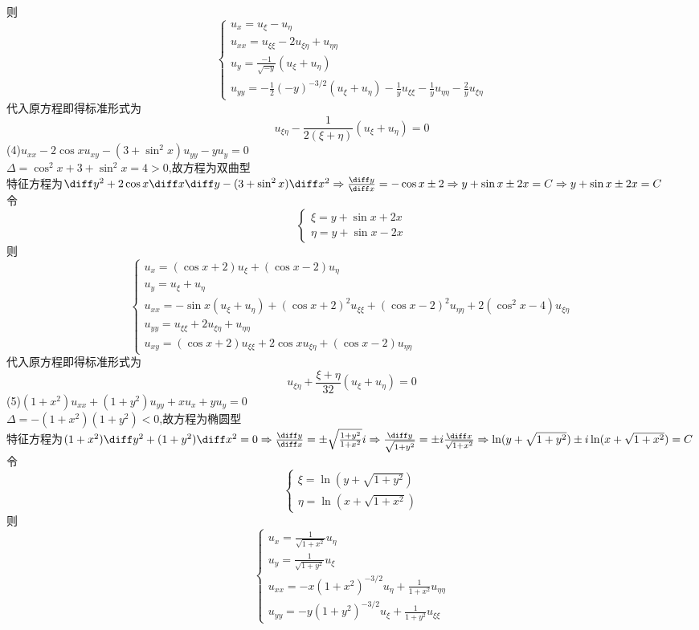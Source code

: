 则
\[\begin{cases}
u_x=u_{\xi}-u_{\eta}\\
u_{xx}=u_{\xi\xi}-2u_{\xi\eta}+u_{\eta\eta}\\
u_{y}=\frac{-1}{\sqrt{-y}}(u_{\xi}+u_{\eta})\\
u_{yy}=-\frac{1}{2}(-y)^{-3/2}(u_{\xi}+u_{\eta})-\frac{1}{y}u_{\xi\xi}-\frac{1}{y}u_{\eta\eta}-\frac{2}{y}u_{\xi\eta}
\end{cases}\]
代入原方程即得标准形式为
\[u_{\xi\eta}-\frac{1}{2(\xi+\eta)}(u_{\xi}+u_{\eta})=0\]
(4)$u_{xx}-2\cos xu_{xy}-(3+\sin^2x)u_{yy}-yu_y=0$\\
$\Delta=\cos^2x+3+\sin^2x=4>0$,故方程为双曲型\\
特征方程为$\diff y^2+2\cos x\diff x\diff y-(3+\sin^2x)\diff x^2\Rightarrow\frac{\diff y}{\diff x}=-\cos x\pm2\Rightarrow y+\sin x\pm2x=C\Rightarrow y+\sin x\pm 2x=C$\\
令\[\begin{cases}
\xi=y+\sin x+2x\\\eta=y+\sin x-2x
\end{cases}\]
则
\[\begin{cases}
u_x=(\cos x+2)u_{\xi}+(\cos x-2)u_{\eta}\\
u_y=u_{\xi}+u_{\eta}\\
u_{xx}=-\sin x(u_{\xi}+u_{\eta})+(\cos x+2)^2u_{\xi\xi}+(\cos x-2)^2u_{\eta\eta}+2(\cos^2x-4)u_{\xi\eta}\\
u_{yy}=u_{\xi\xi}+2u_{\xi\eta}+u_{\eta\eta}\\
u_{xy}=(\cos x+2)u_{\xi\xi}+2\cos xu_{\xi\eta}+(\cos x-2)u_{\eta\eta}
\end{cases}\]
代入原方程即得标准形式为
\[u_{\xi\eta}+\frac{\xi+\eta}{32}(u_{\xi}+u_{\eta})=0\]
(5)$(1+x^2)u_{xx}+(1+y^2)u_{yy}+xu_x+yu_y=0$\\
$\Delta=-(1+x^2)(1+y^2)<0$,故方程为椭圆型\\
特征方程为$(1+x^2)\diff y^2+(1+y^2)\diff x^2=0\Rightarrow\frac{\diff y}{\diff x}=\pm\sqrt{\frac{1+y^2}{1+x^2}}i\Rightarrow\frac{\diff y}{\sqrt{1+y^2}}=\pm i\frac{\diff x}{\sqrt{1+x^2}}\Rightarrow\ln(y+\sqrt{1+y^2})\pm i\ln(x+\sqrt{1+x^2})=C$\\
令\[\begin{cases}
\xi=\ln(y+\sqrt{1+y^2})\\\eta=\ln(x+\sqrt{1+x^2})
\end{cases}\]
则
\[\begin{cases}
u_x=\frac{1}{\sqrt{1+x^2}}u_{\eta}\\
u_y=\frac{1}{\sqrt{1+y^2}}u_{\xi}\\
u_{xx}=-x(1+x^2)^{-3/2}u_{\eta}+\frac{1}{1+x^2}u_{\eta\eta}\\
u_{yy}=-y(1+y^2)^{-3/2}u_{\xi}+\frac{1}{1+y^2}u_{\xi\xi}
\end{cases}\]
